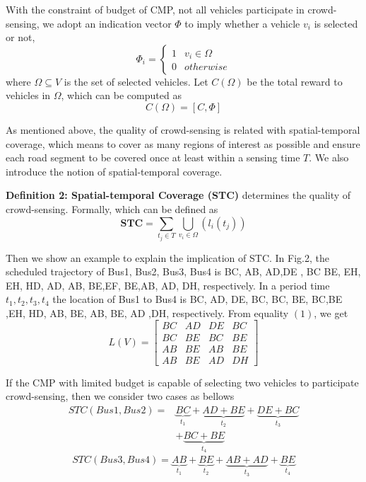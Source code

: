 \documentclass[journal]{IEEEtran}
\begin{document}
With the constraint of budget of CMP, not all vehicles participate in crowd-sensing, we adopt an indication vector $\Phi $ to imply whether a vehicle $v_{i}$ is selected or not,
\begin{equation}
\Phi_{i}= \left\{\begin{matrix}
1&v_{i}\in \Omega \\ 
0&otherwise\end{matrix}\right.
\end{equation}
where $\Omega \subseteq V$ is the set of selected vehicles. Let $C(\Omega)$ be the total reward to vehicles in $\Omega$, which can be computed as
\begin{equation}
C(\Omega )=\left [ C,\Phi  \right ]
\end{equation}

As mentioned above, the quality of crowd-sensing is related with spatial-temporal coverage, which means to cover as many regions of interest as possible and ensure each road segment to be covered once at least within a sensing time $T$. We  also introduce the notion of spatial-temporal coverage.

\noindent
\textbf{Definition 2: Spatial-temporal Coverage (STC)} determines the quality of crowd-sensing. Formally, which can be defined as
\begin{equation}
\textbf{STC}=\sum_{t_{j}\in T}\bigcup_{v_{i}\in \Omega}\left (l_{i}(t_{j}) \right)
\end{equation}

Then we show an example to explain the implication of STC. In Fig.2, the scheduled trajectory of Bus1, Bus2, Bus3, Bus4 is {BC, AB, AD,DE }, {BC BE, EH}, {EH, HD, AD, AB, BE},{EF, BE,AB, AD, DH}, respectively. In a period time $t_{1},t_{2},t_{3},t_{4}$ the location of  Bus1 to Bus4 is {BC, AD, DE, BC}, {BC, BE, BC,BE },{EH, HD, AB, BE}, {AB, BE, AD ,DH}, respectively. From equality $(1)$, we get
\begin{equation}
L(V)=\begin{bmatrix}
BC &AD &DE &BC \\ 
BC& BE &BC &BE\\ 
AB& BE &AB &BE\\ 
AB& BE &AD &DH
\end{bmatrix}
\end{equation}

If the CMP with limited budget is capable of selecting two vehicles to participate crowd-sensing, then we consider two cases as bellows
\begin{equation}
\begin{aligned}
STC({Bus1,Bus2})=& \underset{t_{1}}{\underbrace{BC}}+\underset{t_{2}}{\underbrace{AD+BE}}+\underset{t_{3}}{\underbrace{DE+BC}}\\&+\underset{t_{4}}{\underbrace{BC+BE}}
\end{aligned}
\end{equation}
\begin{equation}
STC({Bus3,Bus4})= \underset{t_{1}}{\underbrace{AB}}+\underset{t_{2}}{\underbrace{BE}}+\underset{t_{3}}{\underbrace{AB+AD}}+\underset{t_{4}}{\underbrace{BE}}
\end{equation}
\end{document}
